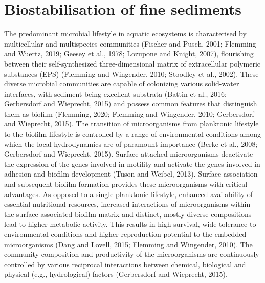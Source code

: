 \section{Biostabilisation of fine sediments}
\label{sec:1}
The predominant microbial lifestyle in aquatic ecosystems is characterised by multicellular and multispecies communities (Fischer and Pusch, 2001; Flemming and Wuertz, 2019; Geesey et al., 1978; Lozupone and Knight, 2007), flourishing between their self-synthesized three-dimensional matrix of extracellular polymeric substances (EPS) (Flemming and Wingender, 2010; Stoodley et al., 2002). These diverse microbial communities are capable of colonizing various solid-water interfaces, with sediment being excellent substrata (Battin et al., 2016; Gerbersdorf and Wieprecht, 2015) and possess common features that distinguish them as biofilm (Flemming, 2020; Flemming and Wingender, 2010; Gerbersdorf and Wieprecht, 2015). The transition of microorganisms from planktonic lifestyle to the biofilm lifestyle is controlled by a range of environmental conditions among which the local hydrodynamics are of paramount importance (Berke et al., 2008; Gerbersdorf and Wieprecht, 2015). Surface-attached microorganisms deactivate the expression of the genes involved in motility and activate the genes involved in adhesion and biofilm development (Tuson and Weibel, 2013). Surface association and subsequent biofilm formation provides these microorganisms with critical advantages. As opposed to a single planktonic lifestyle, enhanced availability of essential nutritional resources, increased interactions of microorganisms within the surface associated biofilm-matrix and distinct, mostly diverse compositions lead to higher metabolic activity. This results in high survival, wide tolerance to environmental conditions and higher reproduction potential to the embedded microorganisms (Dang and Lovell, 2015; Flemming and Wingender, 2010). The community composition and productivity of the microorganisms are continuously controlled by various reciprocal interactions between chemical, biological and physical (e.g., hydrological) factors (Gerbersdorf and Wieprecht, 2015).
